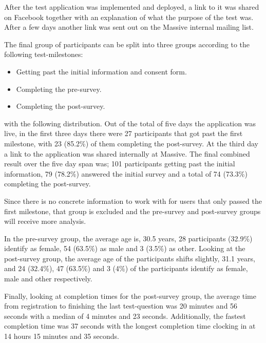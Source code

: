 \documentclass[nofilelist,dvipsnames]{cslthse-msc}
\begin{document}
      After the test application was implemented and deployed, a link to it was
      shared on Facebook together with an explanation of what the purpose of
      the test was. After a few days another link was sent out on the Massive
      internal mailing list.

      The final group of participants can be split into three groups according
      to the following test-milestones:
      \begin{itemize}
        \item{Getting past the initial information and consent form.}
        \item{Completing the pre-survey.}
        \item{Completing the post-survey.}
      \end{itemize}

      with the following distribution.
      Out of the total of five days the application was live, in the first
      three days there were 27 participants that got past the first milestone,
      with 23 (85.2\%) of them completing the post-survey. At the third day a
      link to the application was shared internally at Massive. The final
      combined result over the five day span was; 101 participants getting past
      the initial information, 79 (78.2\%) answered the initial survey and a
      total of 74 (73.3\%) completing the post-survey.

      Since there is no concrete information to work with for users that only
      passed the first milestone, that group is excluded and the pre-survey and
      post-survey groups will receive more analysis.

      In the pre-survey group, the average age is, 30.5 years, 28 participants
      (32.9\%) identify as female, 54 (63.5\%) as male and 3 (3.5\%) as other.
      Looking at the post-survey group, the average age of the participants
      shifts slightly, 31.1 years, and 24 (32.4\%), 47 (63.5\%) and 3 (4\%)
      of the participants identify as female, male and other respectively.

      Finally, looking at completion times for the post-survey group, the average
      time from registration to finishing the last test-question was 20 minutes
      and 56 seconds with a median of 4 minutes and 23 seconds. Additionally,
      the fastest completion time was 37 seconds with the longest completion
      time clocking in at 14 hours 15 minutes and 35 seconds.
%
%
\end{document}
